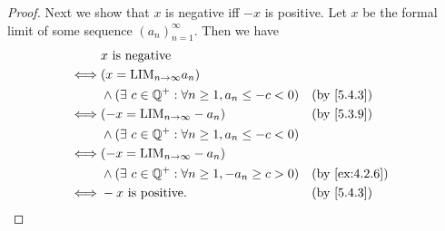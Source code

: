 \begin{proof}
  Next we show that \(x\) is negative iff \(-x\) is positive.
  Let \(x\) be the formal limit of some sequence \((a_n)_{n = 1}^{\infty}\).
  Then we have
  \begin{align*}
         & x \text{ is negative}                                                                            \\
    \iff & (x = \text{LIM}_{n \to \infty} a_n)                                                              \\
         & \land (\exists\ c \in \Q^+ : \forall n \geq 1, a_n \leq -c < 0) &  & \by{5.4.3}                  \\
    \iff & (-x = \text{LIM}_{n \to \infty} -a_n)                           &  & \by{5.3.9}                  \\
         & \land (\exists\ c \in \Q^+ : \forall n \geq 1, a_n \leq -c < 0)                                  \\
    \iff & (-x = \text{LIM}_{n \to \infty} -a_n)                                                            \\
         & \land (\exists\ c \in \Q^+ : \forall n \geq 1, -a_n \geq c > 0) &  & \text{(by \cref{ex:4.2.6})} \\
    \iff & -x \text{ is positive}.                                         &  & \by{5.4.3}
  \end{align*}


\end{proof}
